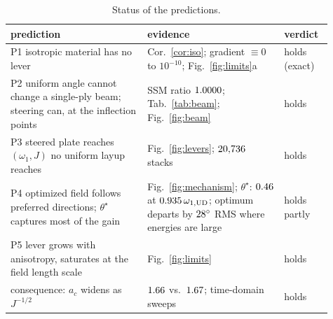 \begin{table}[h]
\centering\footnotesize
\caption{Status of the predictions.}\label{tab:verdict}
\begin{tabular}{@{}p{0.39\linewidth}p{0.39\linewidth}p{0.13\linewidth}@{}}
\toprule
prediction & evidence & verdict\\ \midrule
P1 isotropic material has no lever & Cor.~\ref{cor:iso}; gradient $\equiv0$ to $10^{-10}$; Fig.~\ref{fig:limits}a & holds (exact)\\
P2 uniform angle cannot change a single-ply beam; steering can, at the inflection points & SSM ratio $1.0000$; Tab.~\ref{tab:beam}; Fig.~\ref{fig:beam} & holds\\
P3 steered plate reaches $(\omega_1,J)$ no uniform layup reaches & Fig.~\ref{fig:levers}; $20{,}736$ stacks & holds\\
P4 optimized field follows preferred directions; $\theta^\star$ captures most of the gain & Fig.~\ref{fig:mechanism}; $\theta^\star$: $0.46$ at $0.935\,\omega_{1,\mathrm{UD}}$; optimum departs by $28^\circ$ RMS where energies are large & holds partly\\
P5 lever grows with anisotropy, saturates at the field length scale & Fig.~\ref{fig:limits} & holds\\
consequence: $a_c$ widens as $J^{-1/2}$ & $1.66$ vs.\ $1.67$; time-domain sweeps & holds\\
\bottomrule
\end{tabular}
\end{table}

